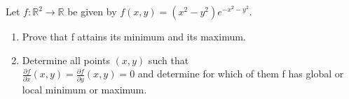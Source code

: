 \documentclass{article}
\begin{document}
	\setlength{\parindent}{0pt}
	Let $f : \mathbb{R}^2 \to \mathbb{R}$ be given by $f(x, y) = (x^2- y^2)e^{-x^2-y^2}$.
	\begin{enumerate}[label=\alph*)]
		\item Prove that f attains its minimum and its maximum.
		\item Determine all points $(x, y)$ such that\\
		$\frac{\partial f}{\partial x}(x, y) =\frac{\partial f}{\partial y}(x, y) = 0$ and
		determine for which of them f has global or local minimum or maximum.
	\end{enumerate}
\end{document}
